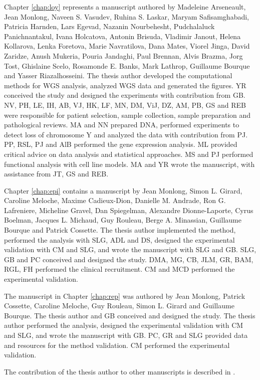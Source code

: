 Chapter \ref{chap:loy} represents a manuscript authored by Madeleine Arseneault, Jean Monlong, Naveen S. Vasudev, Ruhina S. Laskar, Maryam Safisamghabadi, Patricia Harnden, Lars Egevad, Nazanin Nourbehesht, Pudchalaluck Panichnantakul, Ivana Holcatova, Antonin Brisuda, Vladimir Janout, Helena Kollarova, Lenka Foretova, Marie Navratilova, Dana Mates, Viorel Jinga, David Zaridze, Anush Mukeria, Pouria Jandaghi, Paul Brennan, Alvis Brazma, Jorg Tost, Ghislaine Scelo, Rosamonde E. Banks, Mark Lathrop, Guillaume Bourque and Yasser Riazalhosseini.
The thesis author developed the computational methods for WGS analysis, analyzed WGS data and generated the figures.
YR conceived the study and designed the experiments with contribution from GB.
NV, PH, LE, IH, AB, VJ, HK, LF, MN, DM, ViJ, DZ, AM, PB, GS and REB were responsible for patient selection, sample collection, sample preparation and pathological reviews.
MA and NN prepared DNA, performed experiments to detect loss of chromosome Y and analyzed the data with contribution from PJ.
PP, RSL, PJ and AlB performed the gene expression analysis.
ML provided critical advice on data analysis and statistical approaches.
MS and PJ performed functional analysis with cell line models.
MA and YR wrote the manuscript, with assistance from JT, GS and REB.

Chapter \ref{chap:epi} contains a manuscript by Jean Monlong, Simon L. Girard, Caroline Meloche, Maxime Cadieux-Dion, Danielle M. Andrade, Ron G. Lafreniere, Micheline Gravel, Dan Spiegelman, Alexandre Dionne-Laporte, Cyrus Boelman, Jacques L. Michaud, Guy Rouleau, Berge A. Minassian, Guillaume Bourque and Patrick Cossette.
The thesis author implemented the method, performed the analysis with SLG, ADL and DS, designed the experimental validation with CM and SLG, and wrote the manuscript with SLG and GB.
SLG, GB and PC conceived and designed the study.
DMA, MG, CB, JLM, GR, BAM, RGL, FH performed the clinical recruitment.
CM and MCD performed the experimental validation.

The manuscript in Chapter \ref{chap:rep} was authored by Jean Monlong, Patrick Cossette, Caroline Meloche, Guy Rouleau, Simon L. Girard and Guillaume Bourque.
The thesis author and GB conceived and designed the study.
The thesis author performed the analysis, designed the experimental validation with CM and SLG, and wrote the manuscript with GB.
PC, GR and SLG provided data and resources for the method validation.
CM performed the experimental validation.

The contribution of the thesis author to other manuscripts is described in .


